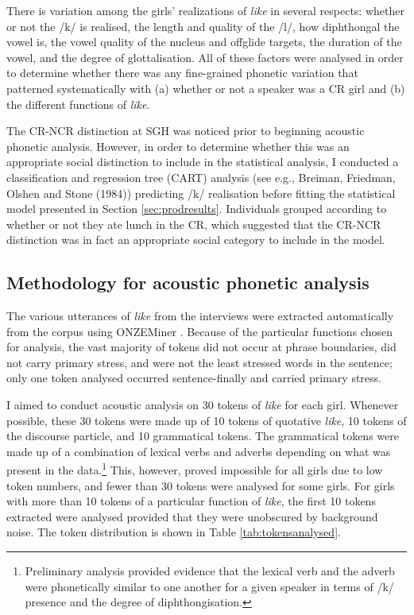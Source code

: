 There is variation among the girls' realizations of \textit{like} in several respects: whether or not the /k/ is realised, the length and quality of the /l/, how diphthongal the vowel is, the vowel quality of the nucleus and offglide targets, the duration of the vowel, and the degree of glottalisation.  All of these factors were analysed in order to determine whether there was any fine-grained phonetic variation that patterned systematically with (a) whether or not a speaker was a CR girl and (b) the different functions of \textit{like}.  


The CR-NCR distinction at SGH was noticed prior to beginning acoustic phonetic analysis.  However, in order to determine whether this was an appropriate social distinction to include in the statistical analysis, I conducted a classification and regression tree (CART) analysis (see e.g., Breiman, Friedman, Olshen and Stone (1984)) predicting /k/ realisation before fitting the statistical model presented in Section \ref{sec:prodresults}.  Individuals grouped according to whether or not they ate lunch in the CR, which suggested that the CR-NCR distinction was in fact an appropriate social category to include in the model. \nocite{breimanetal1984}



\subsection{Methodology for acoustic phonetic analysis}\label{sec:phoneticmethod}


The various utterances of \textit{like} from the interviews were extracted automatically from the corpus using ONZEMiner \cite{onzeminer}.  Because of the particular functions chosen for analysis, the vast majority of tokens did not occur at phrase boundaries, did not carry primary stress, and were not the least stressed words in the sentence; only one token analysed occurred sentence-finally and carried primary stress.  

I aimed to conduct acoustic analysis on 30 tokens of \textit{like} for each girl.  Whenever possible, these 30 tokens were made up of 10 tokens of quotative \textit{like}, 10 tokens of the discourse particle, and 10 grammatical tokens.  The grammatical tokens were made up of a combination of lexical verbs and adverbs depending on what was present in the data.\footnote{Preliminary analysis provided evidence that the lexical verb and the adverb were phonetically similar to one another for a given speaker in terms of /k/ presence and the degree of diphthongisation.}  This, however, proved impossible for all girls due to low token numbers, and fewer than 30 tokens were analysed for some girls.  For girls with more than 10 tokens of a particular function of \textit{like}, the first 10 tokens extracted were analysed provided that they were unobscured by background noise.  The token distribution is shown in Table \ref{tab:tokensanalysed}.

